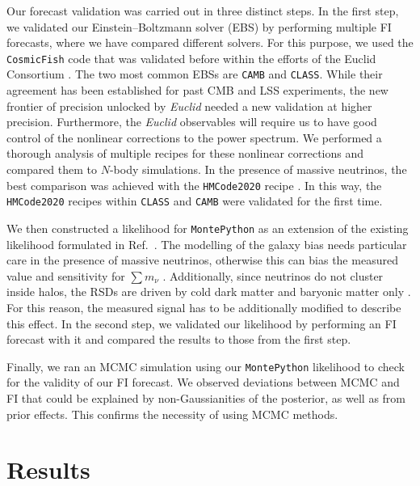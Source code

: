 \documentclass[a4paper,11pt]{article}
\newcommand{\euclid}{\textit{Euclid}\xspace}
\newcommand{\summnu}{\sum m_\nu}
\newcommand{\camb}{\texttt{CAMB}\xspace}
\newcommand{\class}{\texttt{CLASS}\xspace}
\newcommand{\montepython}{\texttt{MontePython}\xspace}
\newcommand{\cosmicfish}{\texttt{CosmicFish}\xspace}
\begin{document}
Our forecast validation was carried out in three distinct steps. In the first step, we validated our Einstein--Boltzmann solver (EBS) by performing multiple FI forecasts, where we have compared different solvers. For this purpose, we used the \cosmicfish code that was validated before within the efforts of the Euclid Consortium \cite{Blanchard-EP7}. The two most common EBSs are \camb \cite{2011ascl.soft02026L} and \class \cite{Diego_Blas_2011}. While their agreement has been established for past CMB and LSS experiments, the new frontier of precision unlocked by \euclid needed a new validation at higher precision. Furthermore, the \euclid observables will require us to have good control of the nonlinear corrections to the power spectrum. We performed a thorough analysis of multiple recipes for these nonlinear corrections and compared them to $N$-body simulations. In the presence of massive neutrinos, the best comparison was achieved with the \texttt{HMCode2020} recipe \cite{Mead_2021}. In this way, the \texttt{HMCode2020} recipes within \class and \camb were validated for the first time.

We then constructed a likelihood for \montepython \cite{Audren:2012wb} as an extension of the existing likelihood formulated in Ref.~\cite{Casas23}. The modelling of the galaxy bias needs particular care in the presence of massive neutrinos, otherwise this can bias the measured value and sensitivity for $\summnu$ \cite{Vagnozzi_2018}. Additionally, since neutrinos do not cluster inside halos, the RSDs are driven by cold dark matter and baryonic matter only \cite{Villaescusa_Navarro_2018}. For this reason, the measured signal has to be additionally modified to describe this effect. In the second step, we validated our likelihood by performing an FI forecast with it and compared the results to those from the first step.

Finally, we ran an MCMC simulation using our \montepython likelihood to check for the validity of our FI forecast. We observed deviations between MCMC and FI that could be explained by non-Gaussianities of the posterior, as well as from prior effects. This confirms the necessity of using MCMC methods.

\section{Results}
\end{document}
